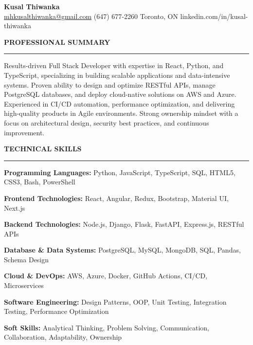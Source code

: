 \documentclass[10pt,letterpaper]{article}
\begin{document}
\begin{center}
{\LARGE\textbf{Kusal Thiwanka}}\\[3pt]
\href{mailto:mhkusalthiwanka@gmail.com}{mhkusalthiwanka@gmail.com}\hspace{2em}%
(647) 677{-}2260\hspace{2em}%
Toronto, ON\hspace{2em}
linkedin.com/in/kusal-thiwanka
\end{center}

\vspace{6pt}

\textbf{PROFESSIONAL SUMMARY}\\[-8pt]
\noindent\rule{\textwidth}{1pt}

\vspace{-2pt}

Results-driven Full Stack Developer with expertise in React, Python, and TypeScript, specializing in building scalable applications and data-intensive systems. Proven ability to design and optimize RESTful APIs, manage PostgreSQL databases, and deploy cloud-native solutions on AWS and Azure. Experienced in CI/CD automation, performance optimization, and delivering high-quality products in Agile environments. Strong ownership mindset with a focus on architectural design, security best practices, and continuous improvement.

\vspace{8pt}

\textbf{TECHNICAL SKILLS}\\[-8pt]
\noindent\rule{\textwidth}{1pt}

\vspace{-2pt}

\textbf{Programming Languages:} Python, JavaScript, TypeScript, SQL, HTML5, CSS3, Bash, PowerShell

\textbf{Frontend Technologies:} React, Angular, Redux, Bootstrap, Material UI, Next.js

\textbf{Backend Technologies:} Node.js, Django, Flask, FastAPI, Express.js, RESTful APIs

\textbf{Database \& Data Systems:} PostgreSQL, MySQL, MongoDB, SQL, Pandas, Schema Design

\textbf{Cloud \& DevOps:} AWS, Azure, Docker, GitHub Actions, CI/CD, Microservices

\textbf{Software Engineering:} Design Patterns, OOP, Unit Testing, Integration Testing, Performance Optimization

\textbf{Soft Skills:} Analytical Thinking, Problem Solving, Communication, Collaboration, Adaptability, Ownership
\end{document}
